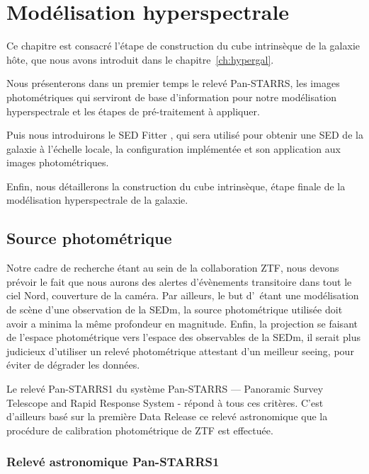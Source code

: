 \documentclass[../main/main.tex]{subfiles}
\begin{document}
\setcounter{chapter}{4}
\chapter{Modélisation hyperspectrale}\label{ch:modelhyperspec}

\minitoc
\vspace{2cm}
Ce chapitre est consacré l'étape de construction du cube intrinsèque de
la galaxie hôte, que nous avons introduit dans le
chapitre~\ref{ch:hypergal}.

Nous présenterons dans un premier temps le relevé Pan-STARRS, les images photométriques
qui serviront de base d'information pour notre modélisation hyperspectrale et les
étapes de pré-traitement à appliquer.

Puis nous introduirons le SED Fitter , qui sera utilisé pour
obtenir une SED de la galaxie à l'échelle locale, la configuration
implémentée et son application aux images photométriques.

Enfin, nous détaillerons la construction du cube intrinsèque, étape
finale de la modélisation hyperspectrale de la galaxie.
\newpage

\section{Source photométrique}
\label{sec:photosource}

Notre cadre de recherche étant au sein de la collaboration ZTF, nous
devons prévoir le fait que nous aurons des alertes d'évènements
transitoire dans tout le ciel Nord, couverture de la caméra. Par
ailleurs, le but d'\hypergal\ étant une modélisation de scène d'une
observation de la SEDm, la source photométrique utilisée doit avoir a
minima la même profondeur en magnitude. Enfin, la projection se faisant
de l'espace photométrique vers l'espace des observables de la SEDm, il
serait plus judicieux d'utiliser un relevé photométrique attestant d'un
meilleur seeing, pour éviter de dégrader les données.

Le relevé Pan-STARRS1 du système Pan-STARRS — Panoramic Survey Telescope and Rapid
Response System - \citep{Kaiser2002,Kaiser2010} répond à tous ces critères. C'est d'ailleurs basé sur
la première Data Release ce relevé astronomique que la procédure de calibration photométrique
de ZTF est effectuée.

\subsection{Relevé astronomique Pan-STARRS1}
\label{ssec:ps1}
\end{document}
